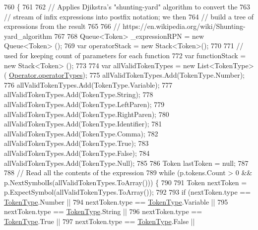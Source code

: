\begin{DoxyCode}
760                                                                          \{
761 
762                 \textcolor{comment}{// Applies Djikstra's "shunting-yard" algorithm to convert the }
763                 \textcolor{comment}{// stream of infix expressions into postfix notation; we then}
764                 \textcolor{comment}{// build a tree of expressions from the result}
765 
766                 \textcolor{comment}{// https://en.wikipedia.org/wiki/Shunting-yard\_algorithm}
767 
768                 Queue<Token> \_expressionRPN = \textcolor{keyword}{new} Queue<Token> ();
769                 var operatorStack = \textcolor{keyword}{new} Stack<Token>();
770 
771                 \textcolor{comment}{// used for keeping count of parameters for each function}
772                 var functionStack = \textcolor{keyword}{new} Stack<Token> (); 
773 
774                 var allValidTokenTypes = \textcolor{keyword}{new} List<TokenType>(
      \hyperlink{a00058_a8dca7db3b76b8c358aba6068274e07df}{Operator.operatorTypes});
775                 allValidTokenTypes.Add(TokenType.Number);
776                 allValidTokenTypes.Add(TokenType.Variable);
777                 allValidTokenTypes.Add(TokenType.String);
778                 allValidTokenTypes.Add(TokenType.LeftParen);
779                 allValidTokenTypes.Add(TokenType.RightParen);
780                 allValidTokenTypes.Add(TokenType.Identifier);
781                 allValidTokenTypes.Add(TokenType.Comma);
782                 allValidTokenTypes.Add(TokenType.True);
783                 allValidTokenTypes.Add(TokenType.False);
784                 allValidTokenTypes.Add(TokenType.Null);
785 
786                 Token lastToken = null;
787 
788                 \textcolor{comment}{// Read all the contents of the expression}
789                 \textcolor{keywordflow}{while} (p.tokens.Count > 0 && p.NextSymbolIs(allValidTokenTypes.ToArray())) \{
790 
791                     Token nextToken = p.ExpectSymbol(allValidTokenTypes.ToArray());
792 
793                     \textcolor{keywordflow}{if} (nextToken.type == \hyperlink{a00026_a301aa7c866593a5b625a8fc158bbeace}{TokenType}.Number ||
794                         nextToken.type == \hyperlink{a00026_a301aa7c866593a5b625a8fc158bbeace}{TokenType}.Variable ||
795                         nextToken.type == \hyperlink{a00026_a301aa7c866593a5b625a8fc158bbeace}{TokenType}.String ||
796                         nextToken.type == \hyperlink{a00026_a301aa7c866593a5b625a8fc158bbeace}{TokenType}.True ||
797                         nextToken.type == \hyperlink{a00026_a301aa7c866593a5b625a8fc158bbeace}{TokenType}.False ||

\end{DoxyCode}
